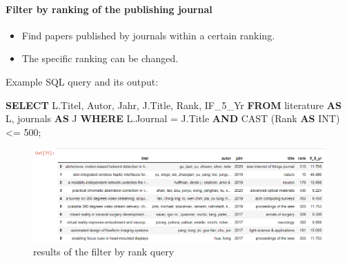\documentclass[11pt]{article}
\makeatletter
\def\maxwidth{\ifdim\Gin@nat@width>\linewidth\linewidth
    \else\Gin@nat@width\fi}
\let\Oldincludegraphics\includegraphics
\renewcommand{\includegraphics}[1]{\Oldincludegraphics[width=.8\maxwidth]{#1}}
\providecommand{\tightlist}{%
      \setlength{\itemsep}{0pt}\setlength{\parskip}{0pt}}
\newenvironment{Shaded}{}{}
\newcommand{\KeywordTok}[1]{\textcolor[rgb]{0.00,0.44,0.13}{\textbf{{#1}}}}
\newcommand{\DataTypeTok}[1]{\textcolor[rgb]{0.56,0.13,0.00}{{#1}}}
\newcommand{\DecValTok}[1]{\textcolor[rgb]{0.25,0.63,0.44}{{#1}}}
\newcommand{\FunctionTok}[1]{\textcolor[rgb]{0.02,0.16,0.49}{{#1}}}
\newcommand{\NormalTok}[1]{{#1}}
\makeatother
\begin{document}
\paragraph{Filter by ranking of the publishing
journal}\label{filter-by-ranking-of-the-publishing-journal}

\begin{itemize}
\tightlist
\item
  Find papers published by journals within a certain ranking.
\item
  The specific ranking can be changed.
\end{itemize}

Example SQL query and its output:

\begin{Shaded}
\begin{Highlighting}[]
\KeywordTok{SELECT}\NormalTok{ L.Titel, Autor, Jahr, J.Title, }\FunctionTok{Rank}\NormalTok{, IF_5_Yr}
\KeywordTok{FROM}\NormalTok{ literature }\KeywordTok{AS}\NormalTok{ L, journals }\KeywordTok{AS}\NormalTok{ J}
\KeywordTok{WHERE}\NormalTok{ L.Journal = J.Title}
\KeywordTok{AND} \FunctionTok{CAST}\NormalTok{ (}\FunctionTok{Rank} \KeywordTok{AS} \DataTypeTok{INT}\NormalTok{) <= }\DecValTok{500}\NormalTok{;}
\end{Highlighting}
\end{Shaded}

\begin{figure}
\centering
\includegraphics{images/filterrank_df.png}
\caption{results of the filter by rank query}
\end{figure}


    
    
    
    
\end{document}
